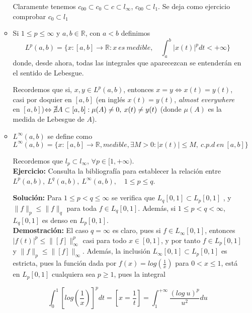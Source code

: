 \documentclass{article}
\begin{document}
\begin{enumerate}
\begin{itemize}
	Claramente tenemos $c_{00}\subset c_0\subset c\subset l_{\infty}$, $c_{00}\subset l_1$. Se deja como ejercicio comprobar $c_0\subset l_1$
	
	\item Si $1\leq p\leq \infty $ y $a,b\in \mathbb{R}$, con $a<b$ definimos
	\begin{equation*}
	L^p(a,b)=\{x:[a,b]\rightarrow \mathbb{R}:x\:es\:medible,\quad \int_a^b|x(t)|^p dt<+\infty \}
	\end{equation*}
	donde, desde ahora, todas las integrales que aparecezcan se entenderán en el sentido de Lebesgue.
	
	Recordemos que si, $x,y\in L^p(a,b)$, entonces $x=y\Leftrightarrow x(t)=y(t)$, casi por doquier en $[a,b]$ (en inglés $x(t)=y(t)$, \textit{almost everywhere} en $[a,b]$)$\Leftrightarrow \cancel{\exists} A\subset [a,b]:\mu(A)\neq0,\:x(t)\neq y(t)$ (donde $\mu(A)$ es la medida de Lebesgue de $A$).
	
	\item $L^\infty(a,b)$ se define como
	\begin{equation*}
	L^\infty(a,b)=\{x:[a,b]\rightarrow \mathbb{R},medible,\exists M>0:|x(t)|\leq M,\:c.p.d\:en\:[a,b]\}
	\end{equation*}	
	
	Recordemos que $l_p\subset l_\infty$, $\forall p\in [1,+\infty)$.\\
	
	\textbf{Ejercicio:} Consulta la bibliografía para establecer la relación entre $L^p(a,b),\:L^q(a,b),\:L^\infty (a,b),\quad 1\leq p\leq q$.
	
	\textbf{Solución:} Para $1\leq p < q \leq \infty$ se verifica que $L_q[0,1] \subset L_p[0,1]$ , y $\|f\|_p\leq \|f\|_q$ para toda $f\in L_q[0,1]$. Además, si $1\leq p<q<\infty$, $L_q[0,1]$ es denso en $L_p[0,1]$. \\
	
	\textbf{Demostración:} El caso $q=\infty$ es claro, pues si $f\in L_\infty[0,1]$, entonces $|f(t)|^p\leq \|[f]\|_\infty^p$ casi para todo $x\in [0,1]$, y por tanto $f\in L_p[0,1]$ y $\|f\|_p\leq \|[f]\|_\infty$. Además, la inclusión $L_\infty
	[0,1]\subset L_p[0,1]$ es estricta, pues la función dada por $f(x)=log(\frac{1}{x})$ para $0<x\leq 1$, está en $L_p[0,1]$ cualquiera sea $p\geq 1$, pues la integral

	\begin{equation*}
	\int_0^1\left[log(\frac{1}{x})\right]^p dt=\left[ x=\frac{1}{t}\right] =\int_1^{+\infty} \frac{(log\:u)^p}{u^2} du
	\end{equation*}	
	

\end{itemize}
\end{enumerate}
\end{document}
